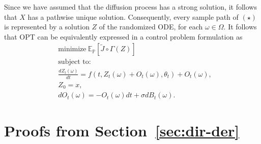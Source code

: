 \documentclass[11pt,leqno]{amsart}
\begin{document}
    Since we have assumed that the diffusion process has a strong solution, it follows that $X$ has a pathwise unique solution. Consequently, every sample path of $(\star)$ is represented by a solution  $Z$ of the randomized ODE, for each $\omega \in \Omega$. It follows that OPT can be equivalently expressed in a control problem formulation as
    \begin{align*}
        &\text{minimize}~\mathbb E_{\mathbb P} \left[ \tilde J\circ\Gamma(Z) \right]\\
        &\text{subject to:}\\
        &\frac{d Z_t(\omega)}{dt} = f(t,Z_t(\omega)+O_t(\omega),\theta_t) + O_t(\omega),\\
        &Z_0 = x,\\
        &dO_t(\omega) = - O_t(\omega) dt + \sigma dB_t(\omega).
    \end{align*}

 \section{Proofs from Section~\ref{sec:dir-der}}
\end{document}
